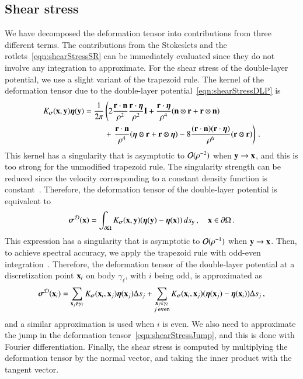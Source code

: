 \documentclass[preprint, 10pt]{elsarticle}
\begin{document}
\subsection{Shear stress}
\label{sec:shearStress}
We have decomposed the deformation tensor into contributions from three different terms.  The contributions from the Stokeslets and the rotlets~\eqref{eqn:shearStressSR} can be immediately evaluated since they do not involve any integration to approximate.  For the shear stress of the double-layer potential, we use a slight variant of the trapezoid rule. The kernel of the deformation tensor due to the double-layer potential~\eqref{eqn:shearStressDLP} is 
\begin{equation}
\begin{aligned}
  K_{\boldsymbol\sigma}({\mathbf{x}},{\mathbf{y}}){\boldsymbol\eta}({\mathbf{y}}) &= \frac{1}{2\pi} \left(
    2\frac{{\mathbf{r}} \cdot {\mathbf{n}}}{\rho^2} \frac{{\mathbf{r}} \cdot {\boldsymbol\eta}}{\rho^2} {\mathbf{I}} + 
    \frac{{\mathbf{r}} \cdot {\boldsymbol\eta}}{\rho^4} ({\mathbf{n}} \otimes {\mathbf{r}} + {\mathbf{r}} \otimes {\mathbf{n}})
    \right. \\ & \hspace{25pt}+ \left.
    \frac{{\mathbf{r}} \cdot {\mathbf{n}}}{\rho^4} ({\boldsymbol\eta} \otimes {\mathbf{r}} + {\mathbf{r}} \otimes {\boldsymbol\eta}) - 
    8\frac{({\mathbf{r}} \cdot {\mathbf{n}})({\mathbf{r}} \cdot {\boldsymbol\eta})}{\rho^6}({\mathbf{r}} \otimes {\mathbf{r}})
  \right) \, .
\end{aligned}
\end{equation}
This kernel has a singularity that is asymptotic to ${\mathcal{O}}(\rho^{-2})$ when ${\mathbf{y}} \rightarrow {\mathbf{x}}$, and this is too strong for the unmodified trapezoid rule.  The singularity strength can be reduced since the velocity corresponding to a constant density function is constant~\cite{poz1992}.  Therefore, the deformation tensor of the double-layer potential is equivalent to
\begin{align}
  {\boldsymbol\sigma}^{{\mathcal{D}}}({\mathbf{x}}) = \int_{{\partial}\Omega}K_{\boldsymbol\sigma}({\mathbf{x}},{\mathbf{y}})
      ({\boldsymbol\eta}({\mathbf{y}}) - {\boldsymbol\eta}({\mathbf{x}})) \, ds_{{\mathbf{y}}}\, , \quad {\mathbf{x}} \in {\partial}\Omega \, .
\end{align}
This expression has a singularity that is asymptotic to ${\mathcal{O}}(\rho^{-1})$ when ${\mathbf{y}} \rightarrow {\mathbf{x}}$.  Then, to achieve spectral accuracy, we apply the trapezoid rule with odd-even integration~\cite{sid-isr1988}.  Therefore, the deformation tensor of the double-layer potential at a discretization point ${\mathbf{x}}_i$ on body $\gamma_\ell$, with $i$ being odd, is approximated as
\begin{align}
  {\boldsymbol\sigma}^{{\mathcal{D}}}({\mathbf{x}}_i) = \sum_{{\mathbf{x}}_j \notin \gamma_\ell}
    K_{\boldsymbol\sigma}({\mathbf{x}}_i,{\mathbf{x}}_j) {\boldsymbol\eta}({\mathbf{x}}_j) \Delta s_j + 
  \sum_{\substack{{\mathbf{x}}_j \in \gamma_\ell \\ j \: \mathtt{even}}}
    K_{\boldsymbol\sigma}({\mathbf{x}}_i,{\mathbf{x}}_j) ({\boldsymbol\eta}({\mathbf{x}}_j) - {\boldsymbol\eta}({\mathbf{x}}_i)) \Delta s_j \, ,
  \label{eqn:stressOddEven}
\end{align}
and a similar approximation is used when $i$ is even.  We also need to approximate the jump in the deformation tensor~\eqref{eqn:shearStressJump}, and this is done with Fourier differentiation.  Finally, the shear stress is computed by multiplying the deformation tensor by the normal vector, and taking the inner product with the tangent vector.
\end{document}
